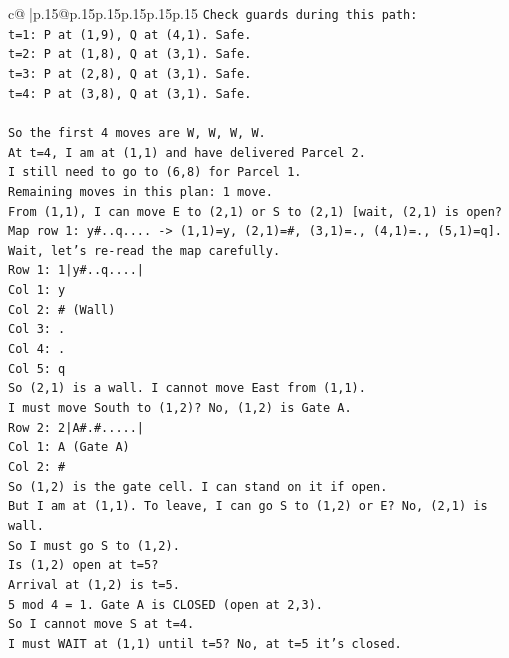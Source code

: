 \documentclass{article}
\begin{document}
{\begin{supertabular}{c@{$\;$}|p{.15\linewidth}@{}p{.15\linewidth}p{.15\linewidth}p{.15\linewidth}p{.15\linewidth}p{.15\linewidth}}
{{{\texttt{Check guards during this path:} \\
\texttt{t=1: P at (1,9), Q at (4,1). Safe.} \\
\texttt{t=2: P at (1,8), Q at (3,1). Safe.} \\
\texttt{t=3: P at (2,8), Q at (3,1). Safe.} \\
\texttt{t=4: P at (3,8), Q at (3,1). Safe.} \\
\\ 
\texttt{So the first 4 moves are W, W, W, W.} \\
\texttt{At t=4, I am at (1,1) and have delivered Parcel 2.} \\
\texttt{I still need to go to (6,8) for Parcel 1.} \\
\texttt{Remaining moves in this plan: 1 move.} \\
\texttt{From (1,1), I can move E to (2,1) or S to (2,1) {[}wait, (2,1) is open? Map row 1: y\#..q.... {-}> (1,1)=y, (2,1)=\#, (3,1)=., (4,1)=., (5,1)=q{]}.} \\
\texttt{Wait, let's re{-}read the map carefully.} \\
\texttt{Row 1: 1|y\#..q....|} \\
\texttt{Col 1: y} \\
\texttt{Col 2: \# (Wall)} \\
\texttt{Col 3: .} \\
\texttt{Col 4: .} \\
\texttt{Col 5: q} \\
\texttt{So (2,1) is a wall. I cannot move East from (1,1).} \\
\texttt{I must move South to (1,2)? No, (1,2) is Gate A.} \\
\texttt{Row 2: 2|A\#.\#.....|} \\
\texttt{Col 1: A (Gate A)} \\
\texttt{Col 2: \#} \\
\texttt{So (1,2) is the gate cell. I can stand on it if open.} \\
\texttt{But I am at (1,1). To leave, I can go S to (1,2) or E? No, (2,1) is wall.} \\
\texttt{So I must go S to (1,2).} \\
\texttt{Is (1,2) open at t=5?} \\
\texttt{Arrival at (1,2) is t=5.} \\
\texttt{5 mod 4 = 1. Gate A is CLOSED (open at 2,3).} \\
\texttt{So I cannot move S at t=4.} \\
\texttt{I must WAIT at (1,1) until t=5? No, at t=5 it's closed.} \\
}}}
\end{supertabular}}
\end{document}
